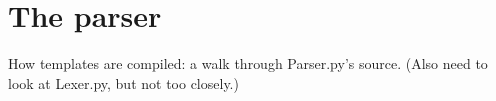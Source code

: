 \section{The parser}
\label{parser}

How templates are compiled: a walk through Parser.py's source.
(Also need to look at Lexer.py, but not too closely.)

